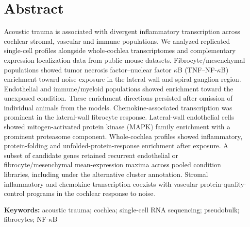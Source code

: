 \section*{Abstract}
Acoustic trauma is associated with divergent inflammatory transcription across cochlear stromal, vascular and immune populations. We analyzed replicated single-cell profiles alongside whole-cochlea transcriptomes and complementary expression-localization data from public mouse datasets. Fibrocyte/\allowbreak{}mesenchymal populations showed tumor necrosis factor--nuclear factor \(\kappa\)B (TNF--NF-\(\kappa\)B) enrichment toward noise exposure in the lateral wall and spiral ganglion region. Endothelial and immune/\allowbreak{}myeloid populations showed enrichment toward the unexposed condition. These enrichment directions persisted after omission of individual animals from the models. Chemokine-associated transcription was prominent in the lateral-wall fibrocyte response. Lateral-wall endothelial cells showed mitogen-activated protein kinase (MAPK) family enrichment with a prominent proteasome component. Whole-cochlea profiles showed inflammatory, protein-folding and unfolded-protein-response enrichment after exposure. A subset of candidate genes retained recurrent endothelial or fibrocyte/\allowbreak{}mesenchymal mean-expression maxima across pooled condition libraries, including under the alternative cluster annotation. Stromal inflammatory and chemokine transcription coexists with vascular protein-quality-control programs in the cochlear response to noise.

\noindent\textbf{Keywords:} acoustic trauma; cochlea; single-cell RNA sequencing; pseudobulk; fibrocytes; NF-\(\kappa\)B
